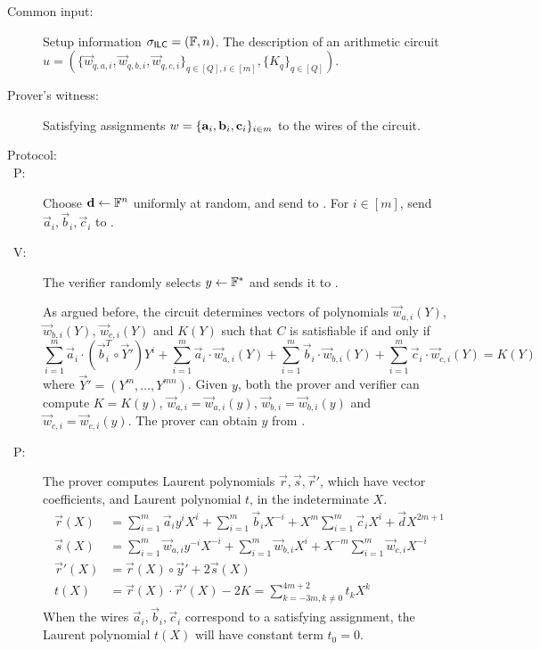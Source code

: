 \begin{description}
\item[Common input:] Setup information $\mathsf{\sigma}_{\mathsf{ILC}} = (\mathbb{F},n)$. The description of an arithmetic circuit $u = \left( \{\vec{w}_{q,{a,i}},\vec{w}_{q,{b,i}},\vec{w}_{q,{c,i}}\}_{q \in [Q], i \in [m]}, \{K_{q}\}_{q \in [Q]}\right)$.
\item[Prover's witness:] Satisfying assignments $w = \{\mathbf{a}_i,\mathbf{b}_i,\mathbf{c}_i\}_{i \in m}$ to the wires of the circuit.
\item[Protocol:]
\item[\ P:]
Choose $\mathbf{d} \gets \mathbb{F}^n$ uniformly at random, and send to \ILC. For $i \in [m]$, send $\vec{a}_{i},\vec{b}_{i},\vec{c}_{i}$ to \ILC.

\item[\ V:] The verifier randomly selects $y\gets \mathbb{F}^*$ and sends it to \ILC.

As argued before, the circuit determines vectors of polynomials $\vec{w}_{a,i}(Y)$, $\vec{w}_{b,i}(Y)$, $\vec{w}_{c,i}(Y)$ and $K(Y)$ such that $C$ is satisfiable if and only if 
$$
\sum_{i=1}^m  \vec{a}_i  \cdot (\vec{b}_i^T \circ \vec{Y}') Y^i+\sum_{i=1}^m \vec{a}_i  \cdot \vec{w}_{a,i}(Y)
+
\sum_{i=1}^m \vec{b}_i \cdot \vec{w}_{b,i}(Y)   +\sum_{i=1}^m \vec{c}_i \cdot \vec{w}_{c,i}(Y) =  K(Y)
$$
where $\vec{Y}'=(Y^m,\ldots,Y^{mn})$. Given $y$, both the prover and verifier can compute $K=K(y)$, $\vec{w}_{a,i}=\vec{w}_{a,i}(y)$, $\vec{w}_{b,i}=\vec{w}_{b,i}(y)$ and $\vec{w}_{c,i}=\vec{w}_{c,i}(y)$. The prover can obtain $y$ from \ILC.

\item[\ P:] The prover computes Laurent polynomials $\vec{r},\vec{s},\vec{r}'$, which have vector coefficients, and Laurent polynomial $t$, in the indeterminate $X$.
\begin{align*}
\vec{r}(X)&=\sum_{i=1}^m\vec{a}_{i}y^i X^{i}+\sum_{i=1}^m\vec{b}_{i} X^{-i}+X^m \sum_{i=1}^m\vec{c}_{i} X^{i}+\vec{d}X^{2m+1}\\
\vec{s}(X)&=\sum_{i=1}^m\vec{w}_{a,i}y^{-i} X^{-i}+\sum_{i=1}^m\vec{w}_{b,i}X^{i}+ X^{-m} \sum_{i=1}^m\vec{w}_{c,i}X^{-i}\\
\vec{r}'(X)&= \vec{r}(X) \circ \vec{y}' + 2\vec{s}(X)\\
 t(X)&=\vec{r}(X)\cdot \vec{r}'(X)-2K=\sum_{k=-3m,k \neq 0}^{4m+2}t_kX^{k}
\end{align*}
When the wires $\vec{a}_{i},\vec{b}_i,\vec{c}_i$ correspond to a satisfying assignment, the Laurent polynomial $t(X)$ will have constant term $t_0=0$. 


\end{description}
